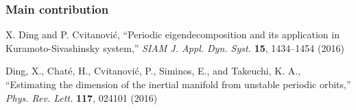 \begin{frame}%
  \frametitle{Main contribution}

  
  \vfill

  
  \vfill

  \begin{block}{}
    \textrm{
      \small
      X. Ding  and P. Cvitanovi\'c,
      ``Periodic eigendecomposition and its application in
      Kuramoto-Sivashinsky system,''
      {\color{red} \emph{SIAM J. Appl. Dyn. Syst.}} {\bf 15}, 1434--1454 (2016)
    }
  \end{block}

  \begin{block}{}
    \textrm{
      \small
      Ding, X., Chat\'e, H., Cvitanovi\'c, P., Siminos, E., and Takeuchi, K. A.,
      ``Estimating the dimension of the inertial manifold from unstable
      periodic orbits,''
      {\color{red}\emph{ Phys. Rev. Lett.}} {\bf 117}, 024101 (2016)
    }
  \end{block}
\end{frame}
